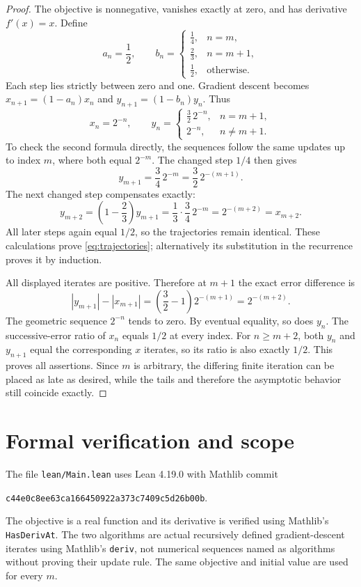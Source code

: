\documentclass[11pt]{article}
\begin{document}
\begin{proof}
The objective is nonnegative, vanishes exactly at zero, and has
derivative $f'(x)=x$. Define
\[
 a_n=\frac12,\qquad
 b_n=\begin{cases}
 \frac14,&n=m,\\[2pt]
 \frac23,&n=m+1,\\[2pt]
 \frac12,&\text{otherwise}.
 \end{cases}
\]
Each step lies strictly between zero and one. Gradient descent becomes
$x_{n+1}=(1-a_n)x_n$ and $y_{n+1}=(1-b_n)y_n$. Thus
\begin{equation}\label{eq:trajectories}
 x_n=2^{-n},\qquad
 y_n=\begin{cases}
 \frac32\,2^{-n},&n=m+1,\\[2pt]
 2^{-n},&n\neq m+1.
 \end{cases}
\end{equation}
To check the second formula directly, the sequences follow the same
updates up to index $m$, where both equal $2^{-m}$. The changed step
$1/4$ then gives
\[
 y_{m+1}=\frac34\,2^{-m}
 =\frac32\,2^{-(m+1)}.
\]
The next changed step compensates exactly:
\[
 y_{m+2}=\left(1-\frac23\right)y_{m+1}
 =\frac13\cdot\frac34\,2^{-m}=2^{-(m+2)}=x_{m+2}.
\]
All later steps again equal $1/2$, so the trajectories remain identical.
These calculations prove \eqref{eq:trajectories}; alternatively its
substitution in the recurrence proves it by induction.

All displayed iterates are positive. Therefore at $m+1$ the exact
error difference is
\[
 |y_{m+1}|-|x_{m+1}|
 =\left(\frac32-1\right)2^{-(m+1)}=2^{-(m+2)}.
\]
The geometric sequence $2^{-n}$ tends to zero. By eventual equality,
so does $y_n$. The successive-error ratio of $x_n$ equals $1/2$
at every index. For $n\geq m+2$, both $y_n$ and $y_{n+1}$ equal
the corresponding $x$ iterates, so its ratio is also exactly $1/2$.
This proves all assertions. Since $m$ is arbitrary, the differing
finite iteration can be placed as late as desired, while the tails
and therefore the asymptotic behavior still coincide exactly.
\end{proof}

\section*{Formal verification and scope}
The file \texttt{lean/Main.lean} uses Lean 4.19.0 with Mathlib commit
\begin{center}\texttt{c44e0c8ee63ca166450922a373c7409c5d26b00b}.\end{center}
The objective is a real function and its derivative is verified using
Mathlib's \texttt{HasDerivAt}. The two algorithms are actual recursively
defined gradient-descent iterates using Mathlib's \texttt{deriv}, not
numerical sequences named as algorithms without proving their update
rule. The same objective and initial value are used for every $m$.
\end{document}
